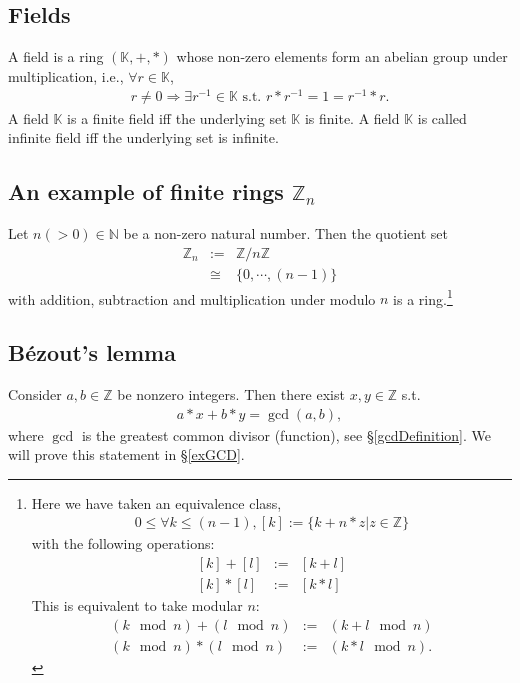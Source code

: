 \documentclass[11pt]{book}
\begin{document}
\subsection{Fields}
A field is a ring $(\mathbb{K},+,*)$ whose non-zero elements form an abelian group under multiplication, i.e., $\forall r \in \mathbb{K}$,
\begin{eqnarray}
r \neq 0 \Rightarrow \exists r^{-1} \in \mathbb{K} \text{ s.t. } r*r^{-1} = 1 = r^{-1}*r.
\end{eqnarray}
A field $\mathbb{K}$ is a finite field iff the underlying set $\mathbb{K}$ is finite.
A field $\mathbb{K}$ is called infinite field iff the underlying set is infinite.

\subsection{An example of finite rings $\mathbb{Z}_n$}
Let $n (>0) \in \mathbb{N}$ be a non-zero natural number.
Then the quotient set
\begin{eqnarray}
\mathbb{Z}_n &:=& \mathbb{Z} / n\mathbb{Z} \\
&\cong& \{0, \cdots, (n-1)\}
\end{eqnarray}
with addition, subtraction and multiplication under modulo $n$ is a ring.\footnote{
Here we have taken an equivalence class, 
\begin{eqnarray}
0 \leq \forall k \leq (n-1), [k] := \{k + n*z | z \in \mathbb{Z} \}
\end{eqnarray}
with the following operations:
\begin{eqnarray}
\left[k \right] + \left[l \right] &:=& \left[k+l\right] \\
\left[k \right] * \left[l \right] &:=& \left[k * l\right]
\end{eqnarray}
This is equivalent to take modular $n$:
\begin{eqnarray}
(k \mod n) + (l \mod n) &:=& (k+l \mod n) \\
(k \mod n) * (l \mod n) &:=& (k*l \mod n).
\end{eqnarray}

}

\subsection{B\'ezout's lemma}
Consider $a,b \in \mathbb{Z}$ be nonzero integers.
Then there exist $x,y \in \mathbb{Z}$ s.t.
\begin{eqnarray}
a*x + b*y = \gcd(a,b),
\end{eqnarray}
where $\gcd$ is the greatest common divisor (function), see \S\ref{gcdDefinition}.
We will prove this statement in \S\ref{exGCD}.
\end{document}
